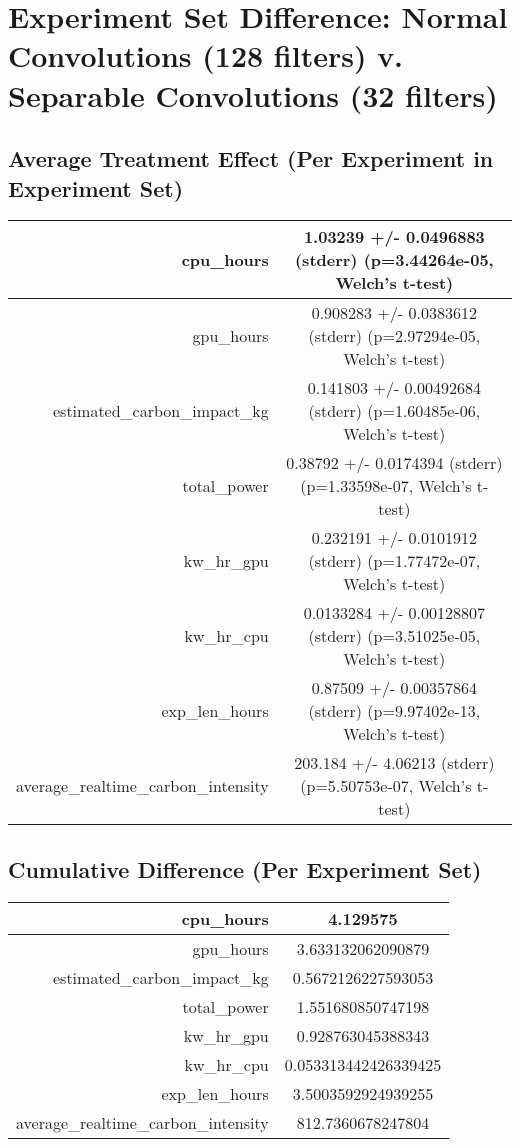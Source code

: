 \documentclass{article}%
\begin{document}
%
\normalsize%
\section{Experiment Set Difference: Normal Convolutions (128 filters) v. Separable Convolutions (32 filters)}%
\label{sec:Experiment Set Difference Normal Convolutions (128 filters) v. Separable Convolutions (32 filters)}%
\subsection{Average Treatment Effect (Per Experiment in Experiment Set)}%
\label{subsec:Average Treatment Effect (Per Experiment in Experiment Set)}%
\begin{tabular}{|r|c|}%
\hline%
cpu\_hours&1.03239 +/{-} 0.0496883 (stderr) (p=3.44264e{-}05, Welch's t{-}test)\\%
\hline%
gpu\_hours&0.908283 +/{-} 0.0383612 (stderr) (p=2.97294e{-}05, Welch's t{-}test)\\%
\hline%
estimated\_carbon\_impact\_kg&0.141803 +/{-} 0.00492684 (stderr) (p=1.60485e{-}06, Welch's t{-}test)\\%
\hline%
total\_power&0.38792 +/{-} 0.0174394 (stderr) (p=1.33598e{-}07, Welch's t{-}test)\\%
\hline%
kw\_hr\_gpu&0.232191 +/{-} 0.0101912 (stderr) (p=1.77472e{-}07, Welch's t{-}test)\\%
\hline%
kw\_hr\_cpu&0.0133284 +/{-} 0.00128807 (stderr) (p=3.51025e{-}05, Welch's t{-}test)\\%
\hline%
exp\_len\_hours&0.87509 +/{-} 0.00357864 (stderr) (p=9.97402e{-}13, Welch's t{-}test)\\%
\hline%
average\_realtime\_carbon\_intensity&203.184 +/{-} 4.06213 (stderr) (p=5.50753e{-}07, Welch's t{-}test)\\%
\hline%
\end{tabular}

%
\subsection{Cumulative Difference (Per Experiment Set)}%
\label{subsec:Cumulative Difference (Per Experiment Set)}%
\begin{tabular}{|r|c|}%
\hline%
cpu\_hours&4.129575\\%
\hline%
gpu\_hours&3.633132062090879\\%
\hline%
estimated\_carbon\_impact\_kg&0.5672126227593053\\%
\hline%
total\_power&1.551680850747198\\%
\hline%
kw\_hr\_gpu&0.928763045388343\\%
\hline%
kw\_hr\_cpu&0.053313442426339425\\%
\hline%
exp\_len\_hours&3.5003592924939255\\%
\hline%
average\_realtime\_carbon\_intensity&812.7360678247804\\%
\hline%
\end{tabular}

%
\end{document}
